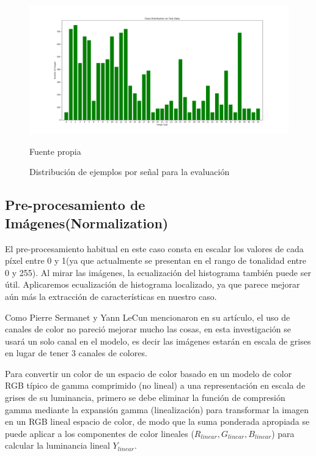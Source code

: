 \begin{figure}[H]
	\includegraphics[width=1.1\textwidth]{images/desarrollo/histograms/initialTest12630}
	\begin{center}
	\caption{\small{Distribución de ejemplos por señal para la evaluación}}
	{\small{Fuente propia}}
	\end{center}
	\vspace{-1.5em}
\end{figure}

\subsection{Pre-procesamiento de Imágenes(Normalization)}
El pre-procesamiento habitual en este caso consta en escalar los valores de cada píxel entre 0 y 1(ya que actualmente se presentan en el rango de tonalidad entre 0 y 255). Al mirar las imágenes, la ecualización del histograma también puede ser útil. Aplicaremos ecualización de histograma localizado, ya que parece mejorar aún más la extracción de características en nuestro caso.

Como Pierre Sermanet y Yann LeCun mencionaron en su artículo\citep{LeCun}, el uso de canales de color no pareció mejorar mucho las cosas, en esta investigación se usará un solo canal en el modelo, es decir las imágenes estarán en escala de grises en lugar de tener 3 canales de colores.

Para convertir un color de un espacio de color basado en un modelo de color RGB típico de gamma comprimido (no lineal) a una representación en escala de grises de su luminancia, primero se debe eliminar la función de compresión gamma mediante la expansión gamma (linealización) para transformar la imagen en un RGB lineal espacio de color, de modo que la suma ponderada apropiada se puede aplicar a los componentes de color lineales ($R_{linear} , G_{linear} , B_{linear}$) para calcular la luminancia lineal $Y_{linear}$.

